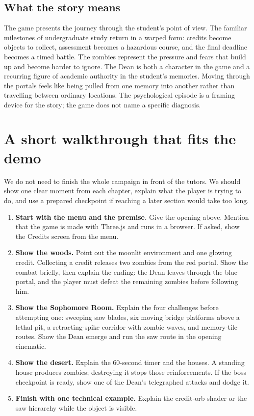 \documentclass[11pt,a4paper]{article}
\newcommand{\key}[1]{\textbf{#1}}
\begin{document}
\subsection{What the story means}
The game presents the journey through the student's point of view. The familiar milestones of undergraduate study return in a warped form: credits become objects to collect, assessment becomes a hazardous course, and the final deadline becomes a timed battle. The zombies represent the pressure and fears that build up and become harder to ignore. The Dean is both a character in the game and a recurring figure of academic authority in the student's memories. Moving through the portals feels like being pulled from one memory into another rather than travelling between ordinary locations. The psychological episode is a framing device for the story; the game does not name a specific diagnosis.

\section{A short walkthrough that fits the demo}

We do not need to finish the whole campaign in front of the tutors. We should show one clear moment from each chapter, explain what the player is trying to do, and use a prepared checkpoint if reaching a later section would take too long.

\begin{enumerate}
  \item \key{Start with the menu and the premise.} Give the opening above. Mention that the game is made with Three.js and runs in a browser. If asked, show the Credits screen from the menu.
  \item \key{Show the woods.} Point out the moonlit environment and one glowing credit. Collecting a credit releases two zombies from the red portal. Show the combat briefly, then explain the ending: the Dean leaves through the blue portal, and the player must defeat the remaining zombies before following him.
  \item \key{Show the Sophomore Room.} Explain the four challenges before attempting one: sweeping saw blades, six moving bridge platforms above a lethal pit, a retracting-spike corridor with zombie waves, and memory-tile routes. Show the Dean emerge and run the saw route in the opening cinematic.
  \item \key{Show the desert.} Explain the 60-second timer and the houses. A standing house produces zombies; destroying it stops those reinforcements. If the boss checkpoint is ready, show one of the Dean's telegraphed attacks and dodge it.
  \item \key{Finish with one technical example.} Explain the credit-orb shader or the saw hierarchy while the object is visible.
\end{enumerate}
\end{document}
